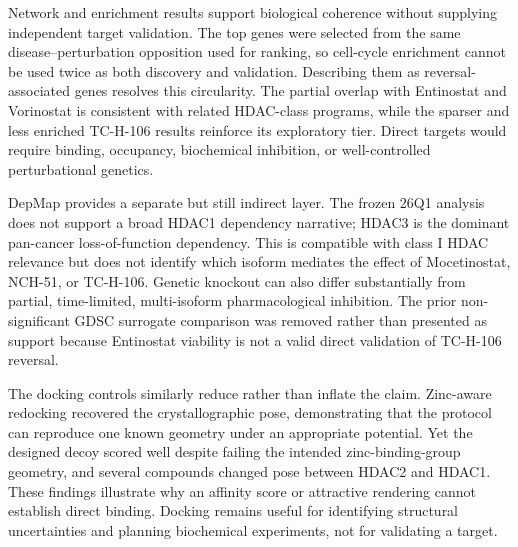 Network and enrichment results support biological coherence without supplying independent target validation. The top genes were selected from the same disease--perturbation opposition used for ranking, so cell-cycle enrichment cannot be used twice as both discovery and validation. Describing them as reversal-associated genes resolves this circularity. The partial overlap with Entinostat and Vorinostat is consistent with related HDAC-class programs, while the sparser and less enriched TC-H-106 results reinforce its exploratory tier. Direct targets would require binding, occupancy, biochemical inhibition, or well-controlled perturbational genetics.

DepMap provides a separate but still indirect layer. The frozen 26Q1 analysis does not support a broad HDAC1 dependency narrative; HDAC3 is the dominant pan-cancer loss-of-function dependency. This is compatible with class I HDAC relevance but does not identify which isoform mediates the effect of Mocetinostat, NCH-51, or TC-H-106. Genetic knockout can also differ substantially from partial, time-limited, multi-isoform pharmacological inhibition. The prior non-significant GDSC surrogate comparison was removed rather than presented as support because Entinostat viability is not a valid direct validation of TC-H-106 reversal.

The docking controls similarly reduce rather than inflate the claim. Zinc-aware redocking recovered the crystallographic pose, demonstrating that the protocol can reproduce one known geometry under an appropriate potential. Yet the designed decoy scored well despite failing the intended zinc-binding-group geometry, and several compounds changed pose between HDAC2 and HDAC1. These findings illustrate why an affinity score or attractive rendering cannot establish direct binding. Docking remains useful for identifying structural uncertainties and planning biochemical experiments, not for validating a target.

